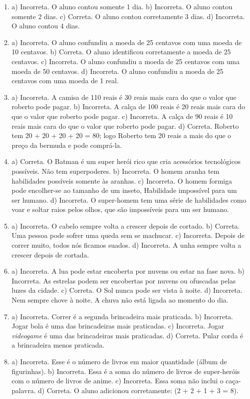 \begin{enumerate}
\item
a) Incorreta. O aluno contou somente 1 dia.
b) Incorreta. O aluno contou somente 2 dias.
c) Correta. O aluno contou corretamente 3 dias.
d) Incorreta. O aluno contou 4 dias.

\item
a) Incorreta. O aluno confundiu a moeda de 25 centavos com uma moeda de
10 centavos.
b) Correta. O aluno identificou corretamente a moeda de 25 centavos.
c) Incorreta. O aluno confundiu a moeda de 25 centavos com uma moeda de
50 centavos.
d) Incorreta. O aluno confundiu a moeda de 25 centavos com uma moeda de
1 real.

\item
a) Incorreta. A camisa de 110 reais é 30 reais mais cara do que o valor que
roberto pode pagar.
b) Incorreta. A calça de 100 reais é 20 reais mais cara do que o valor que
roberto pode pagar.
c) Incorreta. A calça de 90 reais é 10 reais mais cara do que o valor que
roberto pode pagar.
d) Correta. Roberto tem 20 + 20 + 20 + 20 = 80; logo Roberto tem 20
reais a mais do que o preço da bermuda e pode comprá-la.

\item
a) Correta. O Batman é um super herói rico que cria acessórios
tecnológicos possíveis. Não tem superpoderes.
b) Incorreta. O homem aranha tem habilidades possíveis somente às
aranhas.
c) Incorreta. O homem formiga pode encolher-se ao tamanho de um inseto,
Habilidade impossível para um ser humano.
d) Incorreta. O super-homem tem uma série de habilidades como voar e
soltar raios pelos olhos, que são impossíveis para um ser humano.

\item
a) Incorreta. O cabelo sempre volta a crescer depois de cortado.
b) Correta. Uma pessoa pode sofrer uma queda sem se machucar.
c) Incorreta. Depois de correr muito, todos nós ficamos suados.
d) Incorreta. A unha sempre volta a crescer depois de cortada.

\item
a) Incorreta. A lua pode estar encoberta por nuvens ou estar na fase nova.
b) Incorreta. As estrelas podem ser encobertas por nuvens ou ofuscadas pelas luzes da cidade.
c) Correta. O Sol nunca pode ser vista à noite.
d) Incorreta. Nem sempre chove à noite. A chuva não está ligada ao
momento do dia.

\item
a) Incorreta. Correr é a segunda brincadeira mais praticada.
b) Incorreta. Jogar bola é uma das brincadeiras mais praticadas.
c) Incorreta. Jogar \textit{videogame} é uma das brincadeiras mais praticadas.
d) Correta. Pular corda é a brincadeira menos praticada.

\item
a) Incorreta. Esse é o número de livros em maior quantidade (álbum de figurinhas).
b) Incorreta. Essa é a soma do número de livros de super-heróis com o número de livros de anime.
c) Incorreta. Essa soma não inclui o caça-palavra.
d) Correta. O aluno adicionou corretamente: (2 + 2 + 1 + 3 = 8).
\end{enumerate}

